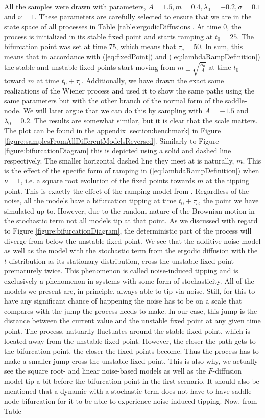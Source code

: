 All the samples were drawn with parameters, $A = 1.5, m = 0.4, \lambda_0 = -0.2, \sigma = 0.1$ and $\nu = 1$. These parameters are carefully selected to ensure that we are in the state space of all processes in Table \ref{table:ergodicDiffusions}. At time $0$, the process is initialized in its stable fixed point and starts ramping at $t_0 = 25$. The bifurcation point was set at time $75$, which means that $\tau_c = 50$. In sum, this means that in accordance with (\ref{eq:fixedPoint}) and (\ref{eq:lambdaRampDefinition}) the stable and unstable fixed points start moving from $m\pm\sqrt{\frac{\lambda_0}{A}}$ at time $t_0$ toward $m$ at time $t_0 + \tau_c$. Additionally, we have drawn the exact same realizations of the Wiener process and used it to show the same paths using the same parameters but with the other branch of the normal form of the saddle-node. We will later argue that we can do this by sampling with $A = -1.5$ and $\lambda_0 = 0.2$. The results are somewhat similar, but it is clear that the scale matters. The plot can be found in the appendix \ref{section:benchmark} in Figure \ref{figure:samplesFromAllDifferentModelsReversed}. Similarly to Figure \ref{figure:bifurcationDiagram} this is depicted using a solid and dashed line respectively. The smaller horizontal dashed line they meet at is naturally, $m$. This is the effect of the specific form of ramping in (\ref{eq:lambdaRampDefinition}) when $\nu = 1$, i.e. a square root evolution of the fixed points towards $m$ at the tipping point. This is exactly the effect of the ramping model from \cite{Ditlevsen2023}. Regardless of the noise, all the models have a bifurcation tipping at time $t_0+\tau_c$, the point we have simulated up to. However, due to the random nature of the Brownian motion in the stochastic term not all models tip at that point. As we discussed with regard to Figure \ref{figure:bifurcationDiagram}, the deterministic part of the process will diverge from below the unstable fixed point. We see that the additive noise model as well as the model with the stochastic term from the ergodic diffusion with the $t$-distribution as its stationary distribution, cross the unstable fixed point prematurely twice. This phenomenon is called noise-induced tipping and is exclusively a phenomenon in systems with some form of stochasticity. All of the models we present are, in principle, always able to tip via noise. Still, for this to have any significant chance of happening the noise has to be on a scale that compares with the jump the process needs to make. In our case, this jump is the distance between the current value and the unstable fixed point at any given time point. The process, natuarlly fluctuates around the stable fixed point, which is located away from the unstable fixed point. However, the closer the path gets to the bifurcation point, the closer the fixed points become. Thus the process has to make a smaller jump cross the unstable fixed point. This is also why, we actually see the square root- and linear noise-based models as well as the $F$-diffusion model tip a bit before the bifurcation point in the first scenario. It should also be mentioned that a dynamic with a stochastic term does not have to have saddle-node bifurcation for it to be able to experience noise-induced tipping. Now, from Table 